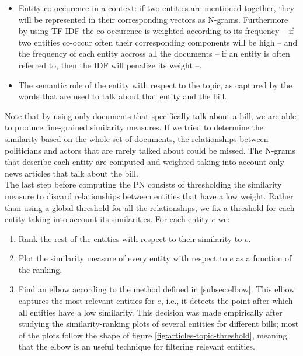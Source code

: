 \begin{itemize}
\item Entity co-occurence in a context: if two entities are mentioned together, they will be represented in their corresponding vectors as N-grams. Furthermore by using TF-IDF the co-occurence is weighted according to its frequency -- if two entities co-occur often their corresponding components will be high -- and the frequency of each entity accross all the documents -- if an entity is often referred to, then the IDF will penalize its weight --.
\item The semantic role of the entity with respect to the topic, as captured by the words that are used to talk about that entity and the bill.
\end{itemize}

Note that by using only documents that specifically talk about a bill, we are able to produce fine-grained similarity measures. If we tried to determine the similarity based on the whole set of documents, the relationships between politicians and actors that are rarely talked about could be missed. The N-grams that describe each entity are computed  and weighted taking into account only news articles that talk about the bill. \\

The last step before computing the PN consists of thresholding the similarity measure to discard relationships between entities that have a low weight. Rather than using a global threshold for all the relationships, we fix a threshold for each entity taking into account its similarities. For each entity $e$ we:

\begin{enumerate}
\item Rank the rest of the entities with respect to their similarity to $e$.
\item Plot the similarity measure of every entity with respect to $e$ as a function of the ranking.
\item Find an elbow according to the method defined in \ref{subsec:elbow}. This elbow captures the most relevant entities for $e$, i.e., it detects the point after which all entities have a low similarity. This decision was made empirically after studying the similarity-ranking plots of several entities for different bills; most of the plots follow the shape of figure \ref{fig:articles-topic-threshold}, meaning that the elbow is an useful technique for filtering relevant entities.
\end{enumerate}


